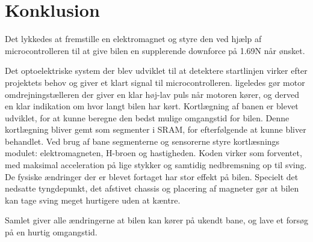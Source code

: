 

\section{Konklusion}


Det lykkedes at fremstille en elektromagnet og styre den ved hjælp af microcontrolleren til at give bilen en supplerende downforce på 1.69N når ønsket.

Det optoelektriske system der blev udviklet til at detektere startlinjen virker efter projektets behov og giver et klart signal til microcontrolleren. ligeledes gør motor omdrejningstælleren der giver en klar høj-lav puls når motoren kører, og derved en klar indikation om hvor langt bilen har kørt.
Kortlægning af banen er blevet udviklet, for at kunne beregne den bedst mulige omgangstid for bilen.
Denne kortlægning bliver gemt som segmenter i SRAM, for efterfølgende at kunne bliver behandlet.
Ved brug af bane segmenterne og sensorerne styre kortlæsnings modulet: elektromagneten, H-broen og hastigheden. Koden virker som forventet, med maksimal acceleration på lige stykker og samtidig nedbremsning op til sving.
De fysiske ændringer der er blevet fortaget har stor effekt på bilen. Specielt det nedsatte tyngdepunkt, det afstivet chassis og placering af magneter gør at bilen kan tage sving meget hurtigere uden at kæntre.

Samlet giver alle ændringerne at bilen kan kører på ukendt bane, og lave et forsøg på en hurtig omgangstid.
